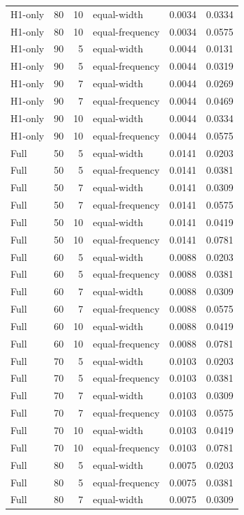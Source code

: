 \begin{tabular}{lrrlrr}
H1-only & 80 & 10 & equal-width & 0.0034 & 0.0334 \\
H1-only & 80 & 10 & equal-frequency & 0.0034 & 0.0575 \\
H1-only & 90 & 5 & equal-width & 0.0044 & 0.0131 \\
H1-only & 90 & 5 & equal-frequency & 0.0044 & 0.0319 \\
H1-only & 90 & 7 & equal-width & 0.0044 & 0.0269 \\
H1-only & 90 & 7 & equal-frequency & 0.0044 & 0.0469 \\
H1-only & 90 & 10 & equal-width & 0.0044 & 0.0334 \\
H1-only & 90 & 10 & equal-frequency & 0.0044 & 0.0575 \\
Full & 50 & 5 & equal-width & 0.0141 & 0.0203 \\
Full & 50 & 5 & equal-frequency & 0.0141 & 0.0381 \\
Full & 50 & 7 & equal-width & 0.0141 & 0.0309 \\
Full & 50 & 7 & equal-frequency & 0.0141 & 0.0575 \\
Full & 50 & 10 & equal-width & 0.0141 & 0.0419 \\
Full & 50 & 10 & equal-frequency & 0.0141 & 0.0781 \\
Full & 60 & 5 & equal-width & 0.0088 & 0.0203 \\
Full & 60 & 5 & equal-frequency & 0.0088 & 0.0381 \\
Full & 60 & 7 & equal-width & 0.0088 & 0.0309 \\
Full & 60 & 7 & equal-frequency & 0.0088 & 0.0575 \\
Full & 60 & 10 & equal-width & 0.0088 & 0.0419 \\
Full & 60 & 10 & equal-frequency & 0.0088 & 0.0781 \\
Full & 70 & 5 & equal-width & 0.0103 & 0.0203 \\
Full & 70 & 5 & equal-frequency & 0.0103 & 0.0381 \\
Full & 70 & 7 & equal-width & 0.0103 & 0.0309 \\
Full & 70 & 7 & equal-frequency & 0.0103 & 0.0575 \\
Full & 70 & 10 & equal-width & 0.0103 & 0.0419 \\
Full & 70 & 10 & equal-frequency & 0.0103 & 0.0781 \\
Full & 80 & 5 & equal-width & 0.0075 & 0.0203 \\
Full & 80 & 5 & equal-frequency & 0.0075 & 0.0381 \\
Full & 80 & 7 & equal-width & 0.0075 & 0.0309 \\

\end{tabular}
